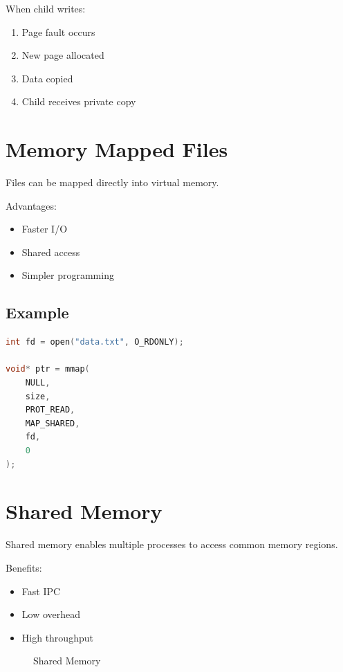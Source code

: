 When child writes:

\begin{enumerate}
\item Page fault occurs
\item New page allocated
\item Data copied
\item Child receives private copy
\end{enumerate}

\section{Memory Mapped Files}

Files can be mapped directly into virtual memory.

Advantages:

\begin{itemize}
\item Faster I/O
\item Shared access
\item Simpler programming
\end{itemize}

\subsection{Example}

\begin{lstlisting}[style=interviewcode,language=C++]
int fd = open("data.txt", O_RDONLY);

void* ptr = mmap(
    NULL,
    size,
    PROT_READ,
    MAP_SHARED,
    fd,
    0
);
\end{lstlisting}

\section{Shared Memory}

Shared memory enables multiple processes to access common memory regions.

Benefits:

\begin{itemize}
\item Fast IPC
\item Low overhead
\item High throughput
\end{itemize}

\begin{figure}[H]
\centering
{}
\caption{Shared Memory}
\end{figure}

